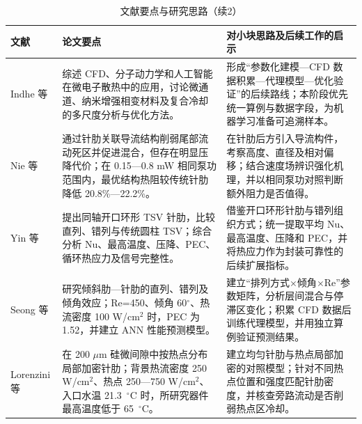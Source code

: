 \documentclass[stage1,fontset=fandol]{ydzjreport}
\begin{document}
\clearpage
\setcounter{table}{2}
\begin{table}[H]
	  \centering
	  \small
	  \renewcommand{\arraystretch}{1.12}
	  \caption{文献要点与研究思路（续2）}
	  \label{tab:notes-cont-5}
	  \begin{tabularx}{\textwidth}{@{}>{\RaggedRight\arraybackslash}p{} Y Y@{}}
	    \toprule
{} 文献 & 论文要点 & 对小块思路及后续工作的启示 \\
	    \midrule
	    Indhe 等\cite{ref20} & 综述 CFD、分子动力学和人工智能在微电子散热中的应用，讨论微通道、纳米增强相变材料及复合冷却的多尺度分析与优化方法。 & 形成“参数化建模—CFD 数据积累—代理模型—优化验证”的后续路线；本阶段优先统一算例与数据字段，为机器学习准备可追溯样本。 \\[3pt]
	    Nie 等\cite{ref21} & 通过针肋关联导流结构削弱尾部流动死区并促进混合，但存在明显压降代价；在 0.15—0.8 mW 相同泵功范围内，最优结构热阻较传统针肋降低 20.8\%—22.2\%。 & 在针肋后方引入导流构件，考察高度、直径及相对偏移；结合速度场辨识强化机理，并以相同泵功对照判断额外阻力是否值得。 \\[3pt]
	    Yin 等\cite{yin} & 提出同轴开口环形 TSV 针肋，比较直列、错列与传统圆柱 TSV；综合分析 Nu、最高温度、压降、PEC、循环热应力及信号完整性。 & 借鉴开口环形针肋与错列组织方式；统一提取平均 Nu、最高温度、压降和 PEC，并将热应力作为封装可靠性的后续扩展指标。 \\[3pt]
	    Seong 等\cite{seong} & 研究倾斜肋—针肋的直列、错列及倾角效应；Re=450、倾角 60$^\circ$、热流密度 100 W/cm$^2$ 时，PEC 为 1.52，并建立 ANN 性能预测模型。 & 建立“排列方式$\times$倾角$\times$Re”参数矩阵，分析层间混合与停滞区变化；积累 CFD 数据后训练代理模型，并用独立算例验证预测结果。 \\[3pt]
	    Lorenzini 等\cite{ref24} & 在 200 $\mu$m 硅微间隙中按热点分布局部加密针肋；背景热流密度 250 W/cm$^2$、热点 250—750 W/cm$^2$、入口水温 21.3 $\,{}^\circ\mathrm{C}$ 时，所研究器件最高温度低于 65 $\,{}^\circ\mathrm{C}$。 & 建立均匀针肋与热点局部加密的对照模型；针对不同热点位置和强度匹配针肋密度，并核查旁路流动是否削弱热点区冷却。 \\[3pt]

	    \bottomrule
	  \end{tabularx}
	\end{table}
\clearpage
\setcounter{figure}{0}
\end{document}
